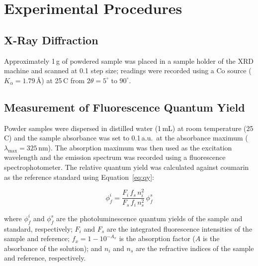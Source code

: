 



\section*{Experimental Procedures}

\subsection*{X-Ray Diffraction}
Approximately 1\,g of powdered sample was placed in a sample holder of the XRD machine
and scanned at 0.1 step size; readings were recorded using a Co source
($K_{\alpha} = 1.79$\,\AA) at 25\,\textdegree C from $2\theta = 5^{\circ}$ to
$90^{\circ}$.

\subsection*{Measurement of Fluorescence Quantum Yield}
Powder samples were dispersed in distilled water (1\,mL) at room temperature
(25\,\textdegree C) and the sample absorbance was set to 0.1\,a.u.\ at the absorbance
maximum ($\lambda_{\max} = 325$\,nm). The absorption maximum was then used as the
excitation wavelength and the emission spectrum was recorded using a fluorescence
spectrophotometer. The relative quantum yield was calculated against coumarin as the
reference standard using Equation~\ref{eq:qy}:

\begin{equation}
  \phi_{f}^{i} = \frac{F_{i}\,f_{s}\,n_{i}^{2}}{F_{s}\,f_{i}\,n_{s}^{2}}\,\phi_{f}^{s}
  \label{eq:qy}
\end{equation}

\noindent where $\phi_{f}^{i}$ and $\phi_{f}^{s}$ are the photoluminescence quantum
yields of the sample and standard, respectively; $F_{i}$ and $F_{s}$ are the integrated
fluorescence intensities of the sample and reference; $f_{x} = 1 - 10^{-A_{x}}$ is the
absorption factor ($A$ is the absorbance of the solution); and $n_{i}$ and $n_{s}$ are
the refractive indices of the sample and reference, respectively.

